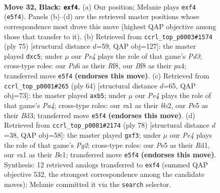 \documentclass[11pt]{article}
\begin{document}
\clearpage

\begin{figure}[p]\centering
\begin{subfigure}{0.46\textwidth}\centering
\resizebox{\linewidth}{!}{%
\newchessgame
\chessboard[
  setfen={rk3b1r/5B2/p4P2/2P1p2p/1P2RB2/8/8/R3K3 b Q - 0 32},
  showmover=false,
  pgfstyle=straightmove, color=movearrow, markmove={e5-f4}
]}
\caption{}
\end{subfigure}\hfill
\begin{subfigure}{0.46\textwidth}\centering
\resizebox{\linewidth}{!}{%
\newchessgame
\chessboard[
  setfen={3b1r2/6k1/1p1p2r1/2BR1p2/PpP5/1P3B2/1R6/5K2 b - - 0 38},
  showmover=false,
  pgfstyle=straightmove, color=movearrow, markmove={d6-c5}
]}
\caption{}
\end{subfigure}
\\[4pt]
\begin{subfigure}{0.46\textwidth}\centering
\resizebox{\linewidth}{!}{%
\newchessgame
\chessboard[
  setfen={1r4k1/7p/6p1/1b1P4/P2r4/3B2PP/1b5R/3R1K2 w - - 0 33},
  showmover=false,
  pgfstyle=straightmove, color=movearrow, markmove={a4-b5}
]}
\caption{}
\end{subfigure}\hfill
\begin{subfigure}{0.46\textwidth}\centering
\resizebox{\linewidth}{!}{%
\newchessgame
\chessboard[
  setfen={8/3k4/5p2/4pr2/7p/3P1b1P/2r3P1/1R1RB2K w - - 0 40},
  showmover=false,
  pgfstyle=straightmove, color=movearrow, markmove={g2-f3}
]}
\caption{}
\end{subfigure}
\caption{\textbf{Move 32, Black: \texttt{exf4}.} (a) Our position; Melanie plays \texttt{exf4} (\texttt{e5f4}). Panels (b)--(d) are the retrieved master positions whose correspondence most drove this move (highest QAP objective among those that transfer to it). (b) Retrieved from \texttt{ccrl\_top\_p0003\#1574} (ply 75) [structural distance $d$=59, QAP obj=127]: the master played \texttt{dxc5}; under $\mu$ our \emph{Pe4} plays the role of that game's \emph{Pd3}; cross-type roles: our \emph{P}a6 as their \emph{R}f8, our \emph{B}f8 as their \emph{p}a4; transferred move \texttt{e5f4} \textbf{(endorses this move)}. (c) Retrieved from \texttt{ccrl\_top\_p0001\#265} (ply 64) [structural distance $d$=65, QAP obj=73]: the master played \texttt{axb5}; under $\mu$ our \emph{Pe4} plays the role of that game's \emph{Pa4}; cross-type roles: our \emph{r}a1 as their \emph{b}b2, our \emph{P}e5 as their \emph{B}d3; transferred move \texttt{e5f4} \textbf{(endorses this move)}. (d) Retrieved from \texttt{ccrl\_top\_p0001\#2174} (ply 78) [structural distance $d$=38, QAP obj=58]: the master played \texttt{gxf3}; under $\mu$ our \emph{Pe4} plays the role of that game's \emph{Pg2}; cross-type roles: our \emph{P}e5 as their \emph{R}d1, our \emph{r}a1 as their \emph{B}e1; transferred move \texttt{e5f4} \textbf{(endorses this move)}. Synthesis: 12 retrieved analogs transferred to \texttt{exf4} (summed QAP objective 532, the strongest correspondence among the candidate moves); Melanie committed it via the \texttt{search} selector.}
\label{fig:thought-m63}
\end{figure}
\end{document}
